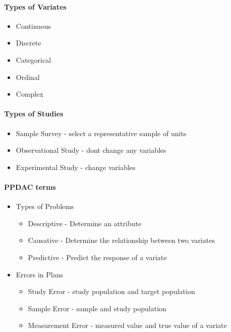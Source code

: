 \documentclass[10pt,letter]{article}
\theoremstyle{plain}
\theoremstyle{definition}
\begin{document}
\paragraph{Types of Variates}
\begin{itemize}
    \item Continuous
    \item Discrete
    \item Categorical
    \item Ordinal
    \item Complex
\end{itemize}

\paragraph{Types of Studies}
\begin{itemize}
    \item Sample Survey - select a representative sample of units
    \item Observational Study - dont change any variables 
    \item Experimental Study - change variables
\end{itemize}

\paragraph{PPDAC terms}
\begin{itemize}
    \item Types of Problems     
    \begin{itemize}
        \item Descriptive - Determine an attribute 
        \item Causative - Determine the relationship between two variates 
        \item Predictive - Predict the response of a variate
    \end{itemize}
    \item Errors in Plans 
    \begin{itemize}
        \item Study Error - study population and target population 
        \item Sample Error - sample and study population 
        \item Measurement Error - measured value and true value of a variate 
    \end{itemize}
\end{itemize}
\end{document}
